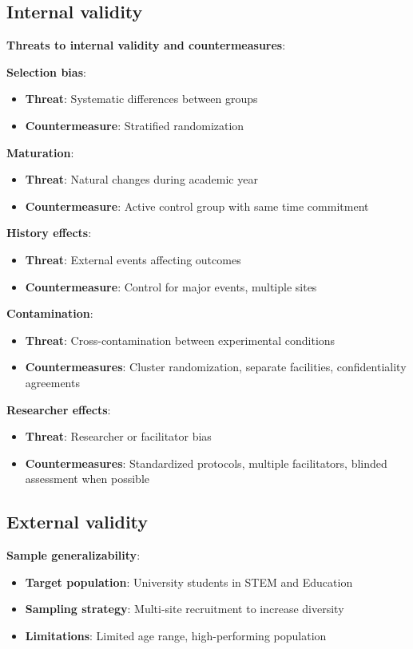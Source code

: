 \subsection*{Internal validity}

\textbf{Threats to internal validity and countermeasures}:

\textbf{Selection bias}:
\begin{itemize}
	\item \textbf{Threat}: Systematic differences between groups
	\item \textbf{Countermeasure}: Stratified randomization
\end{itemize}

\textbf{Maturation}:
\begin{itemize}
	\item \textbf{Threat}: Natural changes during academic year
	\item \textbf{Countermeasure}: Active control group with same time commitment
\end{itemize}

\textbf{History effects}:
\begin{itemize}
	\item \textbf{Threat}: External events affecting outcomes
	\item \textbf{Countermeasure}: Control for major events, multiple sites
\end{itemize}

\textbf{Contamination}:
\begin{itemize}
	\item \textbf{Threat}: Cross-contamination between experimental conditions
	\item \textbf{Countermeasures}: Cluster randomization, separate facilities, confidentiality agreements
\end{itemize}

\textbf{Researcher effects}:
\begin{itemize}
	\item \textbf{Threat}: Researcher or facilitator bias
	\item \textbf{Countermeasures}: Standardized protocols, multiple facilitators, blinded assessment when possible
\end{itemize}

\subsection{External validity}

\textbf{Sample generalizability}:
\begin{itemize}
	\item \textbf{Target population}: University students in STEM and Education
	\item \textbf{Sampling strategy}: Multi-site recruitment to increase diversity
	\item \textbf{Limitations}: Limited age range, high-performing population
\end{itemize}

